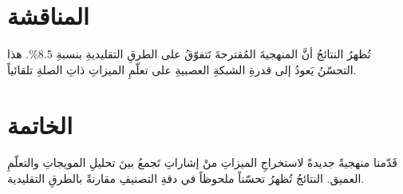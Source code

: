 \documentclass[12pt, a4paper]{article}
\begin{document}
\section{المناقشة}
تُظهرُ النتائجُ أنَّ المنهجيةَ المُقترحةَ تَتفوّقُ على الطرقِ التقليديةِ
بنسبةِ 8.5\%. هذا التحسّنُ يَعودُ إلى قدرةِ الشبكةِ العصبيةِ على تعلّمِ
الميزاتِ ذاتِ الصلةِ تلقائياً.

\section{الخاتمة}
قَدّمنا منهجيةً جديدةً لاستخراجِ الميزاتِ منْ إشاراتِ  تَجمعُ
بينَ تحليلِ المويجاتِ والتعلّمِ العميق. النتائجُ تُظهرُ تحسّناً ملحوظاً
في دقةِ التصنيفِ مقارنةً بالطرقِ التقليدية.
\end{document}
